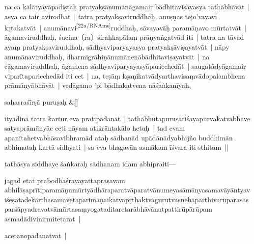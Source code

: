 \documentclass[article,a4paper]{memoir}
\begin{document}
	  \pstart na ca kā\-lā\-tyayā\-padiṣṭaḥ pratyakṣā\-numā\-nā\-gamair bā\-dhitaviṣayasya tathā\-bhā\-vā\-t | asya ca tair avirodhā\-t | tatra pratyakṣaviruddhaḥ, anuṣṇas tejo'vayavī\- kṛtakatvā\-t | anumā\-navi\leavevmode\textsuperscript{\rmlatinfont\tiny [22a/RNAms]}\label{RNAms_22a}ruddhaḥ, sā\-vayavā\-ḥ paramā\-ṇavo mū\-rtatvā\-t | ā\-gamaviruddhaḥ, śucina〔ra〕śiraḥkapā\-laṃ prā\-ṇyaṅgatvā\-d iti | tatra na tā\-vad ayaṃ pratyakṣaviruddhaḥ, sā\-dhyaviparyayasya pratyakṣā\-viṣayatvā\-t | nā\-py anumā\-naviruddhaḥ, dharmigrā\-hiṇā\-numā\-nenā\-bā\-dhitaviṣayatvā\-t | na cā\-gamaviruddhaḥ, ā\-gamena sā\-dhyaviparyayasyā\-paricchedā\-t | saugatā\-dyā\-gamair viparī\-taparicchedā\-d iti cet | na, teṣā\-ṃ kṣaṇikatvā\-dyarthavisaṃvā\-dopalambhena prā\-mā\-ṇyā\-bhā\-vā\-t | vedā\-gamo 'pi bā\-dhakatvena nā\-śaṅkanī\-yaḥ,
	\pend
      
	    
	    \stanza[\smallbreak]
sahasraśī\-rṣā\- puruṣaḥ \&[\smallbreak]


	

	  \pstart ityā\-dinā\- tatra kartur eva pratipā\-danā\-t | tathā\-bhū\-tapuruṣā\-tiśayapū\-rvakatvā\-bhā\-ve satyaprā\-mā\-ṇyā\-c ceti nā\-yam atikrā\-ntakā\-lo hetuḥ | tad evam apanī\-tahetvabhā\-savibhramā\-d ataḥ sā\-dhanā\-d upā\-dā\-nā\-dyabhijño buddhimā\-n abhimataḥ kartā\- sidhyati | sa  eva bhagavā\-n asmā\-kam ī\-śvara iti sthitam ||
	\pend
      

	  \pstart {}\label{sarit__ratnakīrtinibandhāvali__102493}tathā\-sya siddhaye śaṅkaraḥ sā\-dhanam idam abhipraiti—
	\pend
      

	  \pstart jagad etat prabodhā\-śrayā\-yattaprasavam \label{rnā__102330}abhilā\-ṣa\label{rnā__102368}prī\-tiparamā\-ṇumū\-rtyā\-dhā\-raparatvā\-paratvā\-numeyasā\-mā\-nyasamavā\-yā\-ntyaviśeṣatadekā\-rthasamavetaparimā\-ṇaikatvapṛthaktvagurutvasnehā\-pā\-rthivarū\-parasasparśā\-pyadravatvā\-mū\-rtasaṃyogataditaretarā\-bhā\-vā\-nutpattirū\-pā\-rū\-pam asmadā\-divinirmitetarat |
	\pend
      

	  \pstart acetanopā\-dā\-natvā\-t |
	\pend
      
\end{document}
